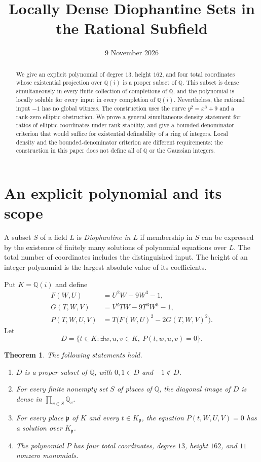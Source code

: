\documentclass[11pt,a4paper]{article}
\title{Locally Dense Diophantine Sets in the Rational Subfield}
\author{}\date{9 November 2026}
\newtheorem{theorem}{Theorem}[section]
\theoremstyle{definition}
\newcommand{\Q}{\mathbb Q}\newcommand{\Z}{\mathbb Z}
\begin{document}
\maketitle
\begin{abstract}
We give an explicit polynomial of degree $13$, height $162$, and
four total coordinates whose existential projection over $\Q(i)$ is
a proper subset of $\Q$. This subset is dense simultaneously in every
finite collection of completions of $\Q$, and the polynomial is locally
soluble for every input in every completion of $\Q(i)$. Nevertheless,
the rational input $-1$ has no global witness. The construction uses
the curve $y^2=x^3+9$ and a rank-zero elliptic obstruction.
We prove a general simultaneous density statement for ratios of
elliptic coordinates under rank stability, and give a bounded-denominator
criterion that would suffice for existential definability of a ring of
integers. Local density and the bounded-denominator criterion are
different requirements: the construction in this paper does not define
all of $\Q$ or the Gaussian integers.
\end{abstract}

\section{An explicit polynomial and its scope}

A subset $S$ of a field $L$ is \emph{Diophantine in $L$} if membership
in $S$ can be expressed by the existence of finitely many solutions of
polynomial equations over $L$. The total number of coordinates includes
the distinguished input. The height of an integer polynomial is the
largest absolute value of its coefficients.

Put $K=\Q(i)$ and define
\begin{align}
 F(W,U)&=U^2W-9W^3-1,\label{eq:F}\\
 G(T,W,V)&=V^2TW-9T^3W^3-1,\label{eq:G}\\
 P(T,W,U,V)&=T\bigl(F(W,U)^2-2G(T,W,V)^2\bigr).\label{eq:P}
\end{align}
Let
\begin{equation}\label{eq:D-definition}
 D=\{t\in K:\exists w,u,v\in K,\ P(t,w,u,v)=0\}.
\end{equation}

\begin{theorem}\label{thm:main}
The following statements hold.
\begin{enumerate}
\item $D$ is a proper subset of $\Q$, with $0,1\in D$ and $-1\notin D$.
\item For every finite nonempty set $S$ of places of $\Q$, the diagonal
image of $D$ is dense in $\prod_{v\in S}\Q_v$.
\item For every place $\mathfrak p$ of $K$ and every $t\in K_{\mathfrak p}$,
the equation $P(t,W,U,V)=0$ has a solution over $K_{\mathfrak p}$.
\item The polynomial $P$ has four total coordinates, degree $13$,
height $162$, and $11$ nonzero monomials.
\end{enumerate}
\end{theorem}
\end{document}
